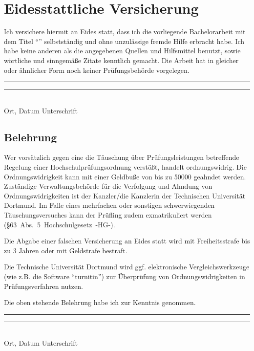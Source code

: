 \newpage
\thispagestyle{empty}
\section*{Eidesstattliche Versicherung}
Ich versichere hiermit an Eides statt, dass ich die vorliegende Bachelorarbeit mit dem Titel \enquote{\thetitle} selbst\-ständig und ohne unzulässige fremde Hilfe erbracht habe.
Ich habe keine anderen als die angegebenen Quellen und Hilfsmittel benutzt, sowie wörtliche und sinngemäße Zitate kenntlich gemacht. 
Die Arbeit hat in gleicher oder ähnlicher Form noch keiner Prüfungsbehörde vorgelegen.

\vspace*{1cm}

\rule{0.4\linewidth}{0.25pt}  \hfill \rule{0.4\linewidth}{0.25pt}\\
Ort, Datum \hfill Unterschrift\hspace*{9.1em}\\

\subsection*{Belehrung}
Wer vorsätzlich gegen eine die Täuschung über Prüfungsleistungen betreffende Regelung einer Hochschulprüfungsordnung verstößt, handelt ordnungswidrig.
Die Ordnungswidrigkeit kann mit einer Geldbuße von bis zu \SI[round-mode=places, round-precision=2]{50000}{\officialeuro} geahndet werden. 
Zuständige Verwaltungsbehörde für die Verfolgung und Ahndung von Ordnungswidrigkeiten ist der Kanzler/die Kanzlerin der Technischen Universität Dortmund. 
Im Falle eines mehrfachen oder sonstigen schwerwiegenden Täuschungsversuches kann der Prüfling zudem exmatrikuliert werden \mbox{(\S63 Abs. 5 Hochschulgesetz -HG-).}

Die Abgabe einer falschen Versicherung an Eides statt wird mit Freiheitsstrafe bis zu 3 Jahren oder mit Geldstrafe bestraft.

Die Technische Universität Dortmund wird ggf. elektronische Vergleichswerkzeuge (wie z.B. die Software \enquote{turnitin}) zur Überprüfung von Ordnungswidrigkeiten in Prüfungsverfahren nutzen.

Die oben stehende Belehrung habe ich zur Kenntnis genommen.

\vspace*{1cm}

\rule{0.4\linewidth}{0.25pt}  \hfill \rule{0.4\linewidth}{0.25pt}\\
Ort, Datum \hfill Unterschrift\hspace*{9.1em}\\

